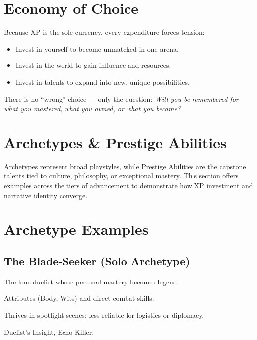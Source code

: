 \documentclass[12pt]{book}
\begin{document}
\section{Economy of Choice}
Because XP is the sole currency, every expenditure forces tension:  

\begin{itemize}
  \item Invest in yourself to become unmatched in one arena.  
  \item Invest in the world to gain influence and resources.  
  \item Invest in talents to expand into new, unique possibilities.  
\end{itemize}

There is no “wrong” choice — only the question: \emph{Will you be remembered for what you mastered, what you owned, or what you became?}

\section{Archetypes \& Prestige Abilities}

Archetypes represent broad playstyles, while Prestige Abilities are the capstone talents tied to culture, philosophy, or exceptional mastery.  
This section offers examples across the tiers of advancement to demonstrate how XP investment and narrative identity converge.

\section{Archetype Examples}

\subsection*{The Blade-Seeker (Solo Archetype)}
\begin{description}[leftmargin=2cm]
  \item[Theme:] The lone duelist whose personal mastery becomes legend.  
  \item[XP Focus:] Attributes (Body, Wits) and direct combat skills.  
  \item[Play Impact:] Thrives in spotlight scenes; less reliable for logistics or diplomacy.  
  \item[Prestige Gateways:] Duelist’s Insight, Echo-Killer.  
\end{description}
\end{document}

